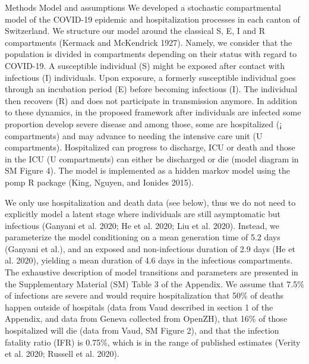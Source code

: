 Methods
Model and assumptions
We developed a stochastic compartmental model of the COVID-19 epidemic and hospitalization processes in each canton of Switzerland. We structure our model around the classical S, E, I and R compartments (Kermack and McKendrick 1927). Namely, we consider that the population is divided in compartments depending on their status with regard to COVID-19. A susceptible individual (S) might be exposed after contact with infectious (I) individuals. Upon exposure, a formerly susceptible individual goes through an incubation period (E) before becoming infectious (I). The individual then recovers (R) and does not participate in transmission anymore. In addition to these dynamics, in the proposed framework after individuals are infected some proportion develop severe disease and among those, some are hospitalized (¡ compartments) and may advance to needing the intensive care unit (U compartments). Hospitalized can progress to discharge, ICU or death and those in the ICU (U compartments) can either be discharged or die (model diagram in SM Figure 4). The model is implemented as a hidden markov model using the pomp R package (King, Nguyen, and Ionides 2015).

We only use hospitalization and death data (see below), thus we do not need to explicitly model a latent stage where individuals are still asymptomatic but infectious (Ganyani et al. 2020; He et al. 2020; Liu et al. 2020). Instead, we parameterize the model conditioning on a mean generation time of 5.2 days (Ganyani et al.), and an exposed and non-infectious duration of 2.9 days (He et al. 2020), yielding a mean duration of 4.6 days in the infectious compartments. The exhaustive description of model transitions and parameters are presented in the Supplementary Material (SM) Table 3 of the Appendix. We assume that 7.5\% of infections are severe and would require hospitalization  that 50\% of deaths happen outside of hospitals (data from Vaud described in section 1 of the Appendix, and data from Geneva collected from OpenZH), that 16\% of those hospitalized will die (data from Vaud, SM Figure 2), and that the infection fatality ratio (IFR) is 0.75\%, which is in the range of published estimates (Verity et al. 2020; Russell et al. 2020). 

